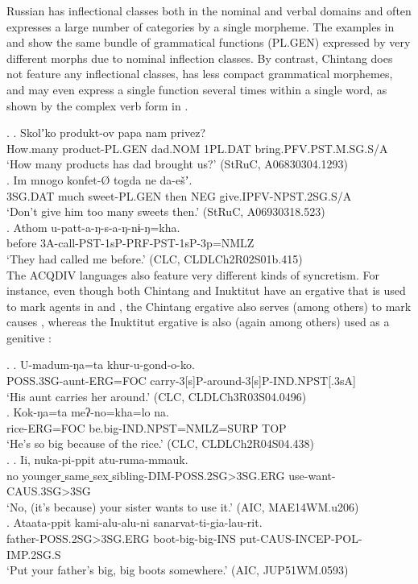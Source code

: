 \documentclass[a4paper, 11pt]{book}
\newcommand{\source}[1]{\hfill (#1)\\[-0.2cm]}	%
\newcommand{\und}{\underline{{ }}\hspace{0.2mm}}	%
\begin{document}
Russian has inflectional classes both in the nominal and verbal domains and often expresses a large number of categories by a single morpheme. The examples in \Next[a] and \Next[b] show the same bundle of grammatical functions (PL.GEN) expressed by very different morphs due to nominal inflection classes. By contrast, Chintang does not feature any inflectional classes, has less compact grammatical morphemes, and may even express a single function several times within a single word, as shown by the complex verb form in \Next[c]. 

\ex.
	\ag. Skolʼko produkt-ov papa nam privez? \\
		How.many product-PL.GEN dad.NOM 1PL.DAT bring.PFV.PST.M.SG.S/A \\
		‘How many products has dad brought us?’ \source{StRuC, A06830304.1293}
	\bg. Im mnogo konfet-Ø togda ne da-ešʼ. \\
		3SG.DAT much sweet-PL.GEN then NEG give.IPFV-NPST.2SG.S/A \\
		‘Don’t give him too many sweets then.’ \source{StRuC, A06930318.523}
	\cg. Athom u-patt-a-ŋ-s-a-ŋ-nɨ-ŋ=kha. \\
		before 3A-call-PST-1sP-PRF-PST-1sP-3p=NMLZ \\
		‘They had called me before.’ \source{CLC, CLDLCh2R02S01b.415}

The ACQDIV languages also feature very different kinds of syncretism. For instance, even though both Chintang and Inuktitut have an ergative that is used to mark agents in \Next[a] and \NNext[a], the Chintang ergative also serves (among others) to mark causes \Next[b], whereas the Inuktitut ergative is also (again among others) used as a genitive \NNext[b]:

\ex.
	\ag. U-madum-ŋa=ta khur-u-gond-o-ko. \\
		POSS.3SG-aunt-ERG=FOC carry-3[s]P-around-3[s]P-IND.NPST[.3sA] \\
		‘His aunt carries her around.’ \source{CLC, CLDLCh3R03S04.0496}
	\bg. Kok-ŋa=ta meʔ-no=kha=lo na. \\
		rice-ERG=FOC be.big-IND.NPST=NMLZ=SURP TOP \\
		‘He’s so big because of the rice.’ \source{CLC, CLDLCh2R04S04.438}

\ex.
	\ag. Ii, nuka-pi-ppit atu-ruma-mmauk. \\
		no younger\und same\und sex\und sibling-DIM-POSS.2SG>3SG.ERG use-want-CAUS.3SG>3SG \\
		‘No, (it’s because) your sister wants to use it.’ \source{AIC, MAE14WM.u206}
	\bg. Ataata-ppit kami-alu-alu-ni sanarvat-ti-gia-lau-rit. \\
		father-POSS.2SG>3SG.ERG boot-big-big-INS put-CAUS-INCEP-POL-IMP.2SG.S \\
		‘Put your father’s big, big boots somewhere.’ \source{AIC, JUP51WM.0593}
\end{document}
